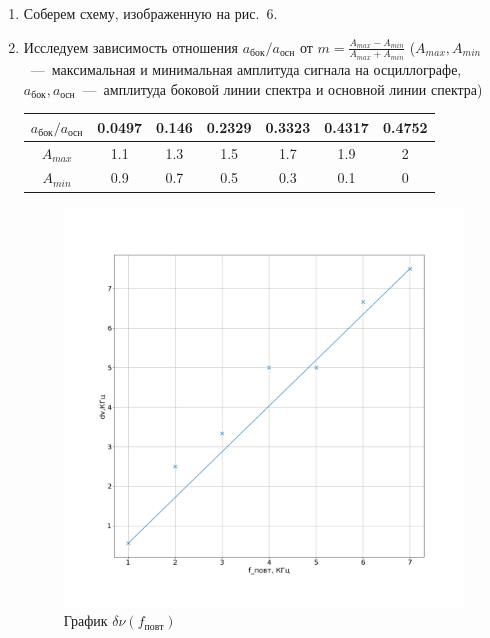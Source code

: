 \documentclass[a4paper, 12pt]{article}
\begin{document}
    \begin{enumerate}
        \item Соберем схему, изображенную на рис.~6.

        \item Исследуем зависимость отношения $a_{бок} / a_{осн}$ от $m = \frac{A_{max} - A_{min}}{A_{max} + A_{min}}$ ($A_{max}, A_{min}$~---~максимальная и минимальная амплитуда сигнала на осциллографе, $a_{бок}, a_{осн}$~---~амплитуда боковой линии спектра и основной линии спектра)

        \begin{tabular}{|c|c|c|c|c|c|c|} \hline
            $a_{бок} / a_{осн}$ & 0.0497 & 0.146 & 0.2329 & 0.3323 & 0.4317 & 0.4752 \\ \hline
            $A_{max}$ & 1.1 & 1.3 & 1.5 & 1.7 & 1.9 & 2 \\ \hline
            $A_{min}$ & 0.9 & 0.7 & 0.5 & 0.3 & 0.1 & 0 \\ \hline
        \end{tabular}

        \begin{figure}[!h]
            \includegraphics[scale=0.4]{graph2.png}
            \caption{График $\delta \nu \left( f_{повт}\right)$}
        \end{figure}


\end{enumerate}
\end{document}
